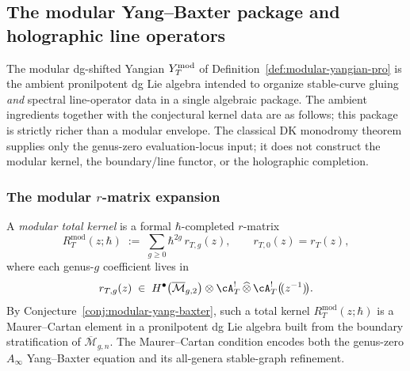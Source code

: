 
\subsection{The modular Yang--Baxter package and holographic line operators}
\label{subsec:modular-yb-holographic}

The modular dg-shifted Yangian $Y^{\mathrm{mod}}_T$ of
Definition~\ref{def:modular-yangian-pro} is the ambient
pronilpotent dg Lie algebra intended to organize
stable-curve gluing \emph{and} spectral line-operator data in a
single algebraic package. The ambient ingredients together with the
conjectural kernel data are as follows; this
package is strictly richer than a modular envelope. The classical DK
monodromy theorem supplies only the genus-zero evaluation-locus input;
it does not construct the modular kernel, the boundary/line functor,
or the holographic completion.

\subsubsection{The modular $r$-matrix expansion}

\begin{definition}
\label{def:modular-total-kernel}
A \emph{modular total kernel} is a formal $\hbar$-completed $r$-matrix
\begin{equation}\label{eq:modular-total-kernel}
 R_T^{\mathrm{mod}}(z;\hbar)
 \;:=\;
 \sum_{g \ge 0} \hbar^{2g}\, r_{T,g}(z),
 \qquad
 r_{T,0}(z) = r_T(z),
\end{equation}
where each genus-$g$ coefficient lives in
\begin{equation}\label{eq:r-coeff-space}
 r_{T,g}(z)
 \;\in\;
 H^\bullet\bigl(\overline{\mathcal{M}}_{g,2}\bigr)
 \otimes
 \cA_T^! \,\widehat{\otimes}\,
 \cA_T^!\bigl(\!(z^{-1})\!\bigr).
\end{equation}
By Conjecture~\ref{conj:modular-yang-baxter}, such a total kernel
$R_T^{\mathrm{mod}}(z;\hbar)$ is a Maurer--Cartan element in a
pronilpotent dg Lie algebra built from the boundary stratification
of $\overline{\mathcal{M}}_{g,n}$. The Maurer--Cartan condition
encodes both the genus-zero $A_\infty$ Yang--Baxter equation and
its all-genera stable-graph refinement.
\end{definition}

